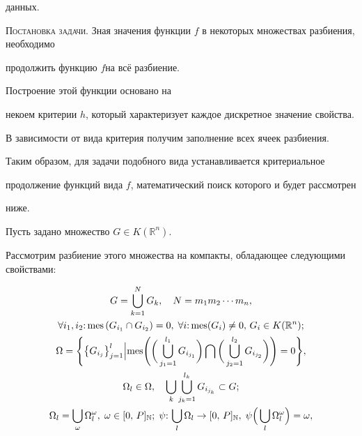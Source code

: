 данных.





\textsc{\small Постановка задачи.} Зная значения функции $f$ в некоторых множествах разбиения, необходимо

продолжить функцию $f $на всё разбиение.

Построение этой функции основано на

некоем критерии $h$, который характеризует каждое дискретное значение свойства.

В зависимости от вида критерия получим заполнение всех ячеек разбиения.

Таким образом, для задачи подобного вида устанавливается критериальное

продолжение функций вида $f$, математический поиск которого и будет рассмотрен

ниже.



Пусть задано множество $G\in K(\mathbb R^n)$.

Рассмотрим разбиение этого множества на компакты, обладающее следующими свойствами:

\begin{gather*}

G=\bigcup\limits_{k=1}^N G_k ,\quad

N=m_1 m_2 \cdots m_n, \\

\forall i_1, i_2{:}\, {\rm mes}\left(G_{i_1}\cap G_{i_2 }   \right)=0,\;

\forall i{:}\,{\rm mes}(G_i)\ne 0,\, G_i \in K(\mathbb R^n);

\\

\Omega =\Bigg\{

\bigl\{ G_{i_j } \bigr\}_{j=1}^l \Big|

{\rm mes}\Bigg(

\bigg( \bigcup\limits_{j_1 =1}^{l_1 } G_{i_{j_1 }}\bigg)  \bigcap

\bigg( \bigcup\limits_{j_2 =1}^{l_2 } G_{i_{j_2 }}\bigg)\Bigg)=0

\Bigg\}, \\

\Omega _l \in \Omega,\quad \bigcup\limits_k \bigcup\limits_{j_k =1}^{l_k }

G_{i_{j_k } } \subset G;

\\

\Omega _l =\bigcup\limits_\omega \Omega _l^\omega  ,\;

\omega \in [0,\, P]_{\mathbb N};\; \psi {:}\,\bigcup\limits_l \Omega _l  \to [0,\, P]_{\mathbb N} ,\;

\psi \Big( \bigcup\limits_l \Omega _l^\omega \Big)=\omega ,

\end{gather*}

